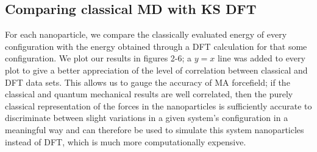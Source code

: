 \documentclass[aps,prb,twocolumn,amsmath,amssymb,superscriptaddress,longbibliography]{revtex4-1}
\newcommand\tab[1][1cm]{\hspace*{#1}} %
\begin{document}


\subsection{Comparing classical MD with KS DFT}

\tab For each nanoparticle, we compare the classically evaluated energy of every configuration with the energy obtained through a DFT calculation for that some configuration. 
We plot our results in figures 2-6; a $y=x$ line was added to every plot to give a better appreciation of the level of correlation between classical and DFT data sets.
This allows us to gauge the accuracy of MA forcefield; if the classical and quantum mechanical results are well correlated, then the purely classical representation of the forces in the nanoparticles is sufficiently accurate to discriminate between slight variations in a given system's configuration in a meaningful way and can therefore be used to simulate this system nanoparticles instead of DFT, which is much more computationally expensive.
\end{document}
